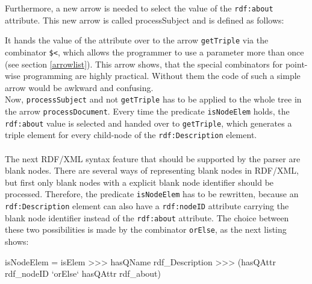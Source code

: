 \documentclass[11pt,a4paper,headsepline, bibtotoc]{scrreprt}
\begin{document}
Furthermore, a new arrow is needed to select the value of the \texttt{rdf:about} attribute. This new arrow is called processSubject and is defined as follows:
It hands the value of the attribute over to the arrow \texttt{getTriple} via the combinator \texttt{\$<}, which allows the programmer to use a parameter more than once (see section \ref{arrowlist}). This arrow shows, that the special combinators for point-wise programming are highly practical. Without them the code of such a simple arrow would be awkward and confusing.\\
Now, \texttt{processSubject} and not \texttt{getTriple} has to be applied to the whole tree in the arrow \texttt{processDocument}. Every time the predicate \texttt{isNodeElem} holds, the \texttt{rdf:about} value is selected and handed over to \texttt{getTriple}, which generates a triple element for every child-node of the \texttt{rdf:Description} element.\\
\\
The next RDF/XML syntax feature that should be supported by the parser are blank nodes. There are several ways of representing blank nodes in RDF/XML, but first only blank nodes with a explicit blank node identifier should be processed. Therefore, the predicate \texttt{isNodeElem} has to be rewritten, because an \texttt{rdf:Description} element can also have a \texttt{rdf:nodeID} attribute carrying the blank node identifier instead of the \texttt{rdf:about} attribute. The choice between these two possibilities is made by the combinator \texttt{orElse}, as the next listing shows:
\enlargethispage{1cm}
\begin{code}[caption=isNodeElem with Blank Node Test, label=isNodeElem]
isNodeElem = isElem >>> hasQName rdf_Description 
         >>> (hasQAttr rdf_nodeID `orElse` hasQAttr rdf_about)
\end{code}
\end{document}
